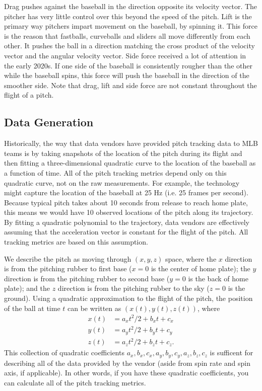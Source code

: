 \documentclass{article}
\begin{document}
    Drag pushes against the baseball in the direction opposite its velocity vector. The pitcher has very little control over this beyond the speed of the pitch. Lift is the primary way pitchers impart movement on the baseball, by spinning it. This force is the reason that fastballs, curveballs and sliders all move differently from each other. It pushes the ball in a direction matching the cross product of the velocity vector and the angular velocity vector. Side force received a lot of attention in the early 2020s. If one side of the baseball is consistently rougher than the other while the baseball spins, this force will push the baseball in the direction of the smoother side. Note that drag, lift and side force are not constant throughout the flight of a pitch.
 
  \subsection{\sc Data Generation}

    Historically, the way that data vendors have provided pitch tracking data to MLB teams is by taking snapshots of the location of the pitch during its flight and then fitting a three-dimensional quadratic curve to the location of the baseball as a function of time. All of the pitch tracking metrics depend only on this quadratic curve, not on the raw measurements. For example, the technology might capture the location of the baseball at 25 Hz (i.e. 25 frames per second). Because typical pitch takes about 10 seconds from release to reach home plate, this means we would have 10 observed locations of the pitch along its trajectory. By fitting a quadratic polynomial to the trajectory, data vendors are effectively assuming that the acceleration vector is constant for the flight of the pitch. All tracking metrics are based on this assumption.

    We describe the pitch as moving through $(x, y, z)$ space, where the $x$ direction is from the pitching rubber to first base ($x = 0$ is the center of home plate); the $y$ direction is from the pitching rubber to second base ($y = 0$ is the back of home plate); and the $z$ direction is from the pitching rubber to the sky ($z = 0$ is the ground). Using a quadratic approximation to the flight of the pitch, the position of the ball at time $t$ can be written as $(x(t), y(t), z(t))$, where
    \begin{align*}
      x(t) &= a_x t^2 / 2 + b_x t + c_x\\
      y(t) &= a_y t^2 / 2 + b_y t + c_y\\
      z(t) &= a_z t^2 / 2 + b_z t + c_z.
    \end{align*}
    This collection of quadratic coefficients $a_x, b_x, c_x, a_y, b_y, c_y, a_z, b_z, c_z$ is sufficent for describing all of the data provided by the vendor (aside from spin rate and spin axis, if applicable). In other words, if you have these quadratic coefficients, you can calculate all of the pitch tracking metrics.
  
\end{document}
